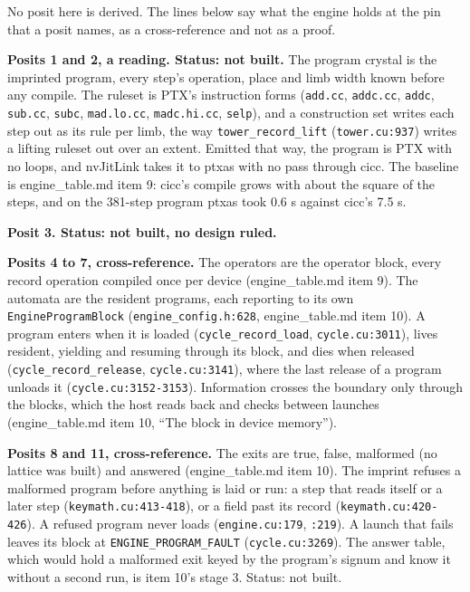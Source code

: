 No posit here is derived. The lines below say what the engine holds at the pin that a posit names, as a cross-reference and not as a proof.

\textbf{Posits 1 and 2, a reading. Status: not built.} The program crystal is the imprinted program, every step's operation, place and limb width known before any compile. The ruleset is PTX's instruction forms (\texttt{add.\allowbreak{}cc}, \texttt{addc.\allowbreak{}cc}, \texttt{addc}, \texttt{sub.\allowbreak{}cc}, \texttt{subc}, \texttt{mad.\allowbreak{}lo.\allowbreak{}cc}, \texttt{madc.\allowbreak{}hi.\allowbreak{}cc}, \texttt{selp}), and a construction set writes each step out as its rule per limb, the way \texttt{tower\_\allowbreak{}record\_\allowbreak{}lift} (\texttt{tower.\allowbreak{}cu:937}) writes a lifting ruleset out over an extent. Emitted that way, the program is PTX with no loops, and nvJitLink takes it to ptxas with no pass through cicc. The baseline is engine\_\allowbreak{}table.md item 9: cicc's compile grows with about the square of the steps, and on the 381-step program ptxas took 0.6 s against cicc's 7.5 s.

\textbf{Posit 3. Status: not built, no design ruled.}

\textbf{Posits 4 to 7, cross-reference.} The operators are the operator block, every record operation compiled once per device (engine\_\allowbreak{}table.md item 9). The automata are the resident programs, each reporting to its own \texttt{Engine\allowbreak{}Program\allowbreak{}Block} (\texttt{engine\_\allowbreak{}config.\allowbreak{}h:628}, engine\_\allowbreak{}table.md item 10). A program enters when it is loaded (\texttt{cycle\_\allowbreak{}record\_\allowbreak{}load}, \texttt{cycle.\allowbreak{}cu:3011}), lives resident, yielding and resuming through its block, and dies when released (\texttt{cycle\_\allowbreak{}record\_\allowbreak{}release}, \texttt{cycle.\allowbreak{}cu:3141}), where the last release of a program unloads it (\texttt{cycle.\allowbreak{}cu:3152-\allowbreak{}3153}). Information crosses the boundary only through the blocks, which the host reads back and checks between launches (engine\_\allowbreak{}table.md item 10, “The block in device memory”).

\textbf{Posits 8 and 11, cross-reference.} The exits are true, false, malformed (no lattice was built) and answered (engine\_\allowbreak{}table.md item 10). The imprint refuses a malformed program before anything is laid or run: a step that reads itself or a later step (\texttt{keymath.\allowbreak{}cu:413-\allowbreak{}418}), or a field past its record (\texttt{keymath.\allowbreak{}cu:420-\allowbreak{}426}). A refused program never loads (\texttt{engine.\allowbreak{}cu:179}, \texttt{:219}). A launch that fails leaves its block at \texttt{ENGINE\_\allowbreak{}PROGRAM\_\allowbreak{}FAULT} (\texttt{cycle.\allowbreak{}cu:3269}). The answer table, which would hold a malformed exit keyed by the program's signum and know it without a second run, is item 10's stage 3. Status: not built.

